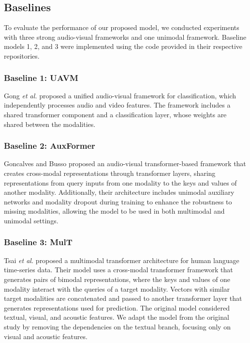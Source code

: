\documentclass{article}
\def \etal {\textit{et al. }}
\begin{document}
\subsection{Baselines}
\label{ssec:baselines}
To evaluate the performance of our proposed model, we conducted experiments with three strong audio-visual frameworks and one unimodal framework. Baseline models 1, 2, and 3 were implemented using the code provided in their respective repositories.

\subsubsection{Baseline 1: UAVM}
Gong \etal \cite{gong_2022} proposed a unified audio-visual framework for classification, which independently processes audio and video features. The framework includes a shared transformer component and a classification layer, whose weights are shared between the modalities.

\subsubsection{Baseline 2: AuxFormer}
Goncalves and Busso \cite{Goncalves_2022} proposed an audio-visual transformer-based framework that creates cross-modal representations through transformer layers, sharing representations from query inputs from one modality to the keys and values of another modality. Additionally, their architecture includes unimodal auxiliary networks and modality dropout during training to enhance the robustness to missing modalities, allowing the model to be used in both multimodal and unimodal settings.

\subsubsection{Baseline 3: MulT}

Tsai \etal \cite{Tsai_2019} proposed a multimodal transformer architecture for human language time-series data. Their model uses a cross-modal transformer framework that generates pairs of bimodal representations, where the keys and values of one modality interact with the queries of a target modality. Vectors with similar target modalities are concatenated and passed to another transformer layer that generates representations used for prediction. The original model considered textual, visual, and acoustic features. We adapt the model from the original study by removing the dependencies on the textual branch, focusing only on visual and acoustic features. 
\end{document}
